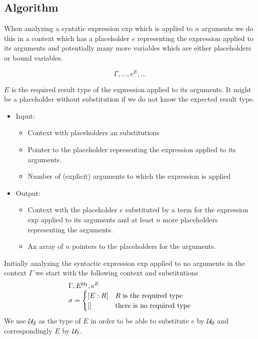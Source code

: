 \subsection{Algorithm}

When analyzing a syntatic expression $\text{exp}$ which is applied to $n$
arguments we do this in a context which has a placeholder $e$ representing the
expression applied to its arguments and potentially many more variables which
are either placeholders or bound variables.

$$
\Gamma, \ldots, e^E, \ldots
$$

$E$ is the required result type of the expression applied to its arguments. It
might be a placeholder without substitution if we do not know the expected
result type.

\begin{itemize}

\item Input:
  \begin{itemize}
  \item Context with placeholders an substitutions
  \item Pointer to the placeholder representing the expression applied to its
    arguments.
  \item Number of (explicit) arguments to which the expression is applied
  \end{itemize}

\item Output:
  \begin{itemize}
  \item Context with the placeholder $e$ substituted by a term for the
    expression $\text{exp}$ applied to its arguments and at least $n$ more
    placeholders representing the arguments.
  \item An array of  $n$ pointers to the placeholders for the arguments.
  \end{itemize}
\end{itemize}

Initially analyzing the syntactic expression $\text{exp}$ applied to no
arguments in the context $\Gamma$ we start with the following context and
substitutions
$$
%
\begin{array}{l}
  \Gamma, E^{\Any_2}, e^E
  \\
  \sigma =
  \begin{cases}
    [E : R] & R \text{ is the required type}
    \\
    []      & \text{there is no required type}
  \end{cases}
\end{array}
$$
%
We use ${\cal{U}}_2$ as the type of $E$ in order to be able to substitute $e$ by
${\cal{U}}_0$ and correspondingly $E$ by ${\cal{U}}_1$.

